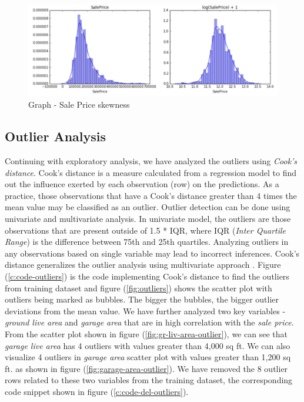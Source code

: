 \documentclass[sigconf]{acmart}
\begin{document}
	\begin{figure}[htb]
		\centering
		\includegraphics[width=1.0\columnwidth]{images/sale_price_skew}	
		\caption{Graph - Sale Price skewness} \label{fig:sale-price-skew} 
	\end{figure}

	\subsection{Outlier Analysis}
	
	Continuing with exploratory analysis, we have analyzed the outliers using {\em Cook's distance}. Cook's distance is a measure calculated from a regression model to find out the influence exerted by each observation (row) on the predictions. As a practice,  those observations that have a Cook's distance greater than 4 times the mean value may be classified as an outlier. Outlier detection can be done using univariate and multivariate analysis. In univariate model, the outliers are those observations that are present outside of 1.5 * IQR, where IQR ({\em Inter Quartile Range}) is the difference between 75th and 25th quartiles. Analyzing outliers in any observations based on single variable may lead to incorrect inferences. Cook's distance generalizes the outlier analysis using multivariate approach \cite{1}. Figure (\ref{c:code-outliers}) is the code implementing Cook's distance to find the outliers from training dataset and figure (\ref{fig:outliers}) shows the scatter plot with outliers being marked as bubbles. The bigger the bubbles, the bigger outlier deviations from the mean value. We have further analyzed two key variables - {\em ground live area} and {\em garage area} that are in high correlation with the {\em sale price}. From the scatter plot shown in figure (\ref{fig:gr-liv-area-outlier}), we can see that {\em garage live area} has 4 outliers with values greater than 4,000 sq ft. We can also visualize 4 outliers in {\em garage area} scatter plot with values greater than 1,200 sq ft. as shown in figure (\ref{fig:garage-area-outlier}).  We have removed the 8 outlier rows related to these two variables from the training dataset, the corresponding code snippet shown in figure (\ref{c:code-del-outliers}).
	
\end{document}
